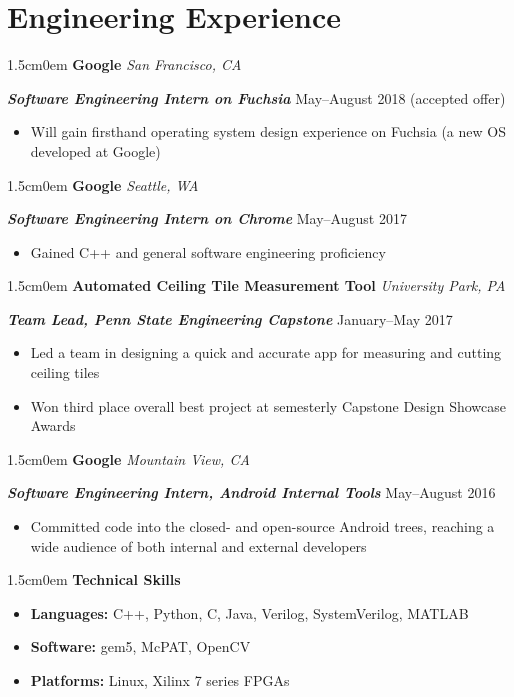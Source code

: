 \documentclass[letterpaper]{article}
\newcommand{\primaryindent}{1.5cm} %
\newenvironment{indented}{\begin{adjustwidth}{\primaryindent}{0em}}{\end{adjustwidth}}
\newenvironment{resumelist}{\begin{itemize}[topsep=0pt,noitemsep,itemindent=-15pt,leftmargin=30pt]}{\end{itemize}}
\newcommand{\generalentry}[5]{
	\begin{indented}
		\Large \textsf{\textbf{#1}} \hfill	%
			\hfill\normalsize\textit{#2} \par  			%
		\noindent \large \textsf{\textbf{\textit{#3}}} 	%
			\hfill \normalsize #4\par 					%
		\normalsize \normalfont #5 \par					%
		\normalsize \normalfont
	\end{indented}
	}
\begin{document}
\section*{Engineering Experience}
\generalentry{Google}{San Francisco, CA}{Software Engineering Intern on Fuchsia}{May--August 2018 (accepted offer)}{
	\begin{resumelist}
		\item Will gain firsthand operating system design experience on Fuchsia (a new OS developed at Google)

	\end{resumelist}
}
\vspace{3mm} %

\generalentry{Google}{Seattle, WA}{Software Engineering Intern on Chrome}{May--August 2017}{
	\begin{resumelist}
		\item Gained C++ and general software engineering proficiency
	\end{resumelist}
}
\vspace{3mm}
\generalentry{Automated Ceiling Tile Measurement Tool}{University Park, PA}{Team Lead, Penn State Engineering Capstone}{January--May 2017}{
	\begin{resumelist}
		\item Led a team in designing a quick and accurate app for measuring and cutting ceiling tiles
		\item Won third place overall best project at semesterly Capstone Design Showcase Awards 
	\end{resumelist}
}

\vspace{3mm}


\generalentry{Google}{Mountain View, CA}{Software Engineering Intern, Android Internal Tools}{May--August 2016}{
	\begin{resumelist}
		\item Committed code into the closed- and open-source Android trees, reaching a wide audience of both internal and external developers
	\end{resumelist}
}

\vspace{2mm}
\begin{indented}
	\large \textsf{\textbf{Technical Skills}}
	\normalsize \normalfont \par
	\begin{resumelist}
		\item \textbf{Languages:} C++, Python, C, Java, Verilog, SystemVerilog, MATLAB
		\item \textbf{Software:} gem5, McPAT, OpenCV
		\item \textbf{Platforms:} Linux, Xilinx 7 series FPGAs 
	\end{resumelist}
\end{indented}
\end{document}
